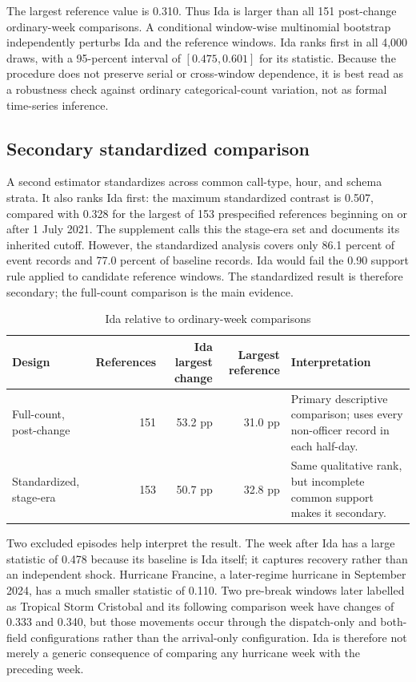 \documentclass[11pt]{article}
\begin{document}
The largest reference value is 0.310. Thus Ida is larger than all 151 post-change ordinary-week comparisons. A conditional window-wise multinomial bootstrap independently perturbs Ida and the reference windows. Ida ranks first in all 4,000 draws, with a 95-percent interval of $[0.475,0.601]$ for its statistic. Because the procedure does not preserve serial or cross-window dependence, it is best read as a robustness check against ordinary categorical-count variation, not as formal time-series inference.

\subsection{Secondary standardized comparison}

A second estimator standardizes across common call-type, hour, and schema strata. It also ranks Ida first: the maximum standardized contrast is 0.507, compared with 0.328 for the largest of 153 prespecified references beginning on or after 1 July 2021. The supplement calls this the stage-era set and documents its inherited cutoff. However, the standardized analysis covers only 86.1 percent of event records and 77.0 percent of baseline records. Ida would fail the 0.90 support rule applied to candidate reference windows. The standardized result is therefore secondary; the full-count comparison is the main evidence.

\begin{table}[!htbp]
\centering
\caption{Ida relative to ordinary-week comparisons}
\label{tab:comparison}
\begin{tabularx}{\textwidth}{@{}lrrrX@{}}
\toprule
Design & References & Ida largest change & Largest reference & Interpretation \\
\midrule
Full-count, post-change & 151 & 53.2 pp & 31.0 pp &
Primary descriptive comparison; uses every non-officer record in each half-day. \\
Standardized, stage-era & 153 & 50.7 pp & 32.8 pp &
Same qualitative rank, but incomplete common support makes it secondary. \\
\bottomrule
\end{tabularx}
\end{table}

Two excluded episodes help interpret the result. The week after Ida has a large statistic of 0.478 because its baseline is Ida itself; it captures recovery rather than an independent shock. Hurricane Francine, a later-regime hurricane in September 2024, has a much smaller statistic of 0.110. Two pre-break windows later labelled as Tropical Storm Cristobal and its following comparison week have changes of 0.333 and 0.340, but those movements occur through the dispatch-only and both-field configurations rather than the arrival-only configuration. Ida is therefore not merely a generic consequence of comparing any hurricane week with the preceding week.
\end{document}

